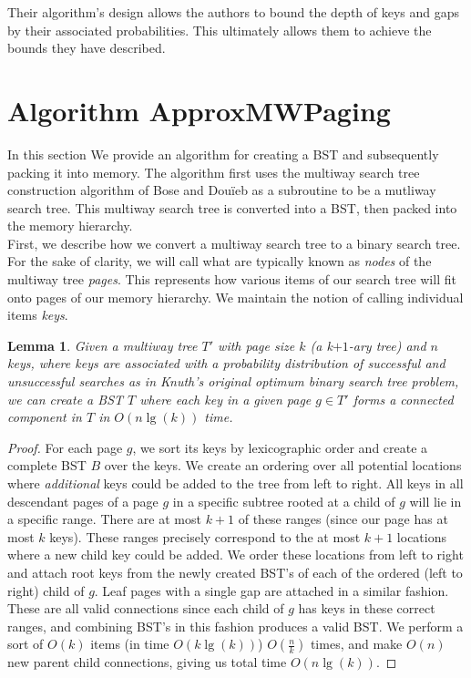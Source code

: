 \documentclass[letterpaper,12pt,titlepage,oneside,final]{book}
\theoremstyle{plain}
\newtheorem{lem}[thm]{Lemma}
\begin{document}
 Their algorithm's design allows the authors to bound the depth of keys and gaps by their associated probabilities. This ultimately allows them to achieve the bounds they have described. 

\section{Algorithm ApproxMWPaging}\label{Algorithm ApproxMWPaging}

In this section We provide an algorithm for creating a BST and subsequently packing it into memory. The algorithm first uses the multiway search tree construction algorithm of Bose and Dou\"{i}eb as a subroutine to be a mutliway search tree. This multiway search tree is converted into a BST, then packed into the memory hierarchy. \\

First, we describe how we convert a multiway search tree to a binary search tree. For the sake of clarity, we will call what are typically known as \textit{nodes} of the multiway tree \textit{pages}. This represents how various items of our search tree will fit onto pages of our memory hierarchy. We maintain the notion of calling individual items \textit{keys}.

\begin{lem}\label{MWTBSTLem}
Given a multiway tree $T'$ with page size $k$ (a k$+1$-ary tree) and $n$ keys, where keys are associated with a probability distribution of successful and unsuccessful searches as in Knuth's original optimum binary search tree problem, we can create a BST $T$ where each key in a given page $g \in T'$ forms a connected component in $T$ in $O(n\lg(k))$ time.
\end{lem}

\begin{proof}
For each page $g$, we sort its keys by lexicographic order and create a complete BST $B$ over the keys. We create an ordering over all potential locations where \textit{additional} keys could be added to the tree from left to right. All keys in all descendant pages of a page $g$ in a specific subtree rooted at a child of $g$ will lie in a specific range. There are at most $k+1$ of these ranges (since our page has at most $k$ keys). These ranges precisely correspond to the at most $k+1$ locations where a new child key could be added. We order these locations from left to right and attach root keys from the newly created BST's of each of the ordered (left to right) child of $g$. Leaf pages with a single gap are attached in a similar fashion. These are all valid connections since each child of $g$ has keys in these correct ranges, and combining BST's in this fashion produces a valid BST. We perform a sort of $O(k)$ items (in time $O(k\lg(k))$) $O(\frac{n}{k})$ times, and make $O(n)$ new parent child connections, giving us total time $O(n \lg(k))$.
\end{proof}
\end{document}
